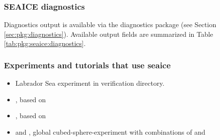 
\subsubsection{SEAICE diagnostics
\label{sec:pkg:seaice:diagnostics}}

Diagnostics output is available via the diagnostics package
(see Section \ref{sec:pkg:diagnostics}).
Available output fields are summarized in 
Table \ref{tab:pkg:seaice:diagnostics}.




\subsubsection{Experiments and tutorials that use seaice}
\label{sec:pkg:seaice:experiments}

\begin{itemize}
\item{Labrador Sea experiment in  verification directory. }
\item {}, based on 
\item {}, based on 
\item {} and
  , global
  cubed-sphere-experiment with combinations of  and
\end{itemize}


